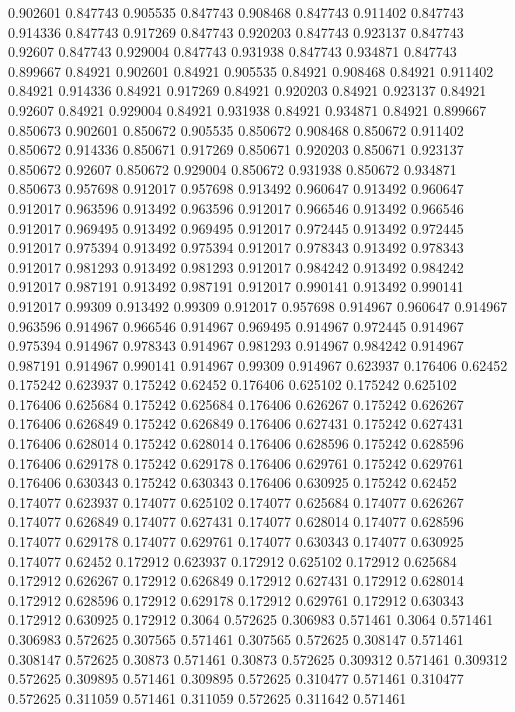 0.902601 0.847743
0.905535 0.847743
0.908468 0.847743
0.911402 0.847743
0.914336 0.847743
0.917269 0.847743
0.920203 0.847743
0.923137 0.847743
0.92607 0.847743
0.929004 0.847743
0.931938 0.847743
0.934871 0.847743
0.899667 0.84921
0.902601 0.84921
0.905535 0.84921
0.908468 0.84921
0.911402 0.84921
0.914336 0.84921
0.917269 0.84921
0.920203 0.84921
0.923137 0.84921
0.92607 0.84921
0.929004 0.84921
0.931938 0.84921
0.934871 0.84921
0.899667 0.850673
0.902601 0.850672
0.905535 0.850672
0.908468 0.850672
0.911402 0.850672
0.914336 0.850671
0.917269 0.850671
0.920203 0.850671
0.923137 0.850672
0.92607 0.850672
0.929004 0.850672
0.931938 0.850672
0.934871 0.850673
0.957698 0.912017
0.957698 0.913492
0.960647 0.913492
0.960647 0.912017
0.963596 0.913492
0.963596 0.912017
0.966546 0.913492
0.966546 0.912017
0.969495 0.913492
0.969495 0.912017
0.972445 0.913492
0.972445 0.912017
0.975394 0.913492
0.975394 0.912017
0.978343 0.913492
0.978343 0.912017
0.981293 0.913492
0.981293 0.912017
0.984242 0.913492
0.984242 0.912017
0.987191 0.913492
0.987191 0.912017
0.990141 0.913492
0.990141 0.912017
0.99309 0.913492
0.99309 0.912017
0.957698 0.914967
0.960647 0.914967
0.963596 0.914967
0.966546 0.914967
0.969495 0.914967
0.972445 0.914967
0.975394 0.914967
0.978343 0.914967
0.981293 0.914967
0.984242 0.914967
0.987191 0.914967
0.990141 0.914967
0.99309 0.914967
0.623937 0.176406
0.62452 0.175242
0.623937 0.175242
0.62452 0.176406
0.625102 0.175242
0.625102 0.176406
0.625684 0.175242
0.625684 0.176406
0.626267 0.175242
0.626267 0.176406
0.626849 0.175242
0.626849 0.176406
0.627431 0.175242
0.627431 0.176406
0.628014 0.175242
0.628014 0.176406
0.628596 0.175242
0.628596 0.176406
0.629178 0.175242
0.629178 0.176406
0.629761 0.175242
0.629761 0.176406
0.630343 0.175242
0.630343 0.176406
0.630925 0.175242
0.62452 0.174077
0.623937 0.174077
0.625102 0.174077
0.625684 0.174077
0.626267 0.174077
0.626849 0.174077
0.627431 0.174077
0.628014 0.174077
0.628596 0.174077
0.629178 0.174077
0.629761 0.174077
0.630343 0.174077
0.630925 0.174077
0.62452 0.172912
0.623937 0.172912
0.625102 0.172912
0.625684 0.172912
0.626267 0.172912
0.626849 0.172912
0.627431 0.172912
0.628014 0.172912
0.628596 0.172912
0.629178 0.172912
0.629761 0.172912
0.630343 0.172912
0.630925 0.172912
0.3064 0.572625
0.306983 0.571461
0.3064 0.571461
0.306983 0.572625
0.307565 0.571461
0.307565 0.572625
0.308147 0.571461
0.308147 0.572625
0.30873 0.571461
0.30873 0.572625
0.309312 0.571461
0.309312 0.572625
0.309895 0.571461
0.309895 0.572625
0.310477 0.571461
0.310477 0.572625
0.311059 0.571461
0.311059 0.572625
0.311642 0.571461
